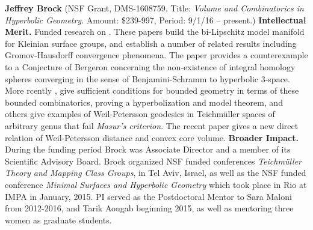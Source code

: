 \textbf{Jeffrey Brock} (NSF Grant, DMS-1608759. Title: {\em Volume and Combinatorics in Hyperbolic Geometry}. Amount: \$239-997, Period: 9/1/16 --
present.)  \textbf{Intellectual Merit.} 
Funded research on 
\cite{Brock:Canary:Minsky:elc,BBCM:pullout,
BBCL:dlt,Brock:Dunfield:inj,Brock:ams}.
 These papers build the bi-Lipschitz model manifold for Kleinian surface groups, and establish a number of related results including Gromov-Hausdorff convergence phenomena.
The paper \cite{Brock:Dunfield:inj} provides a counterexample to a Conjecture of Bergeron concerning the non-existence of integral homology spheres converging in the sense of
Benjamini-Schramm to hyperbolic 3-space.  
More rcently \cite{BMNS:bounded:models,Brock:Modami:nue,Brock:Bromberg:vol,Brock:Bromberg:cone:inflex}, give sufficient conditions for bounded geometry in terms of these bounded combinatorics, proving a hyperbolization and model theorem, and others give examples of Weil-Petersson geodesics in Teichm\"uller spaces of arbitrary genus that fail {\em Masur's criterion}. The recent paper
  \cite{Brock:Bromberg:vol} gives a new direct relation of Weil-Petersson distance and convex core volume.
\textbf{Broader Impact.} During the funding period Brock was Associate Director and a member of its Scientific Advisory Board. Brock organized NSF funded conferences \textit{ Teichm\"uller Theory and Mapping Class Groups}, in Tel Aviv, Israel, as well as the NSF funded conference \textit{ Minimal Surfaces and Hyperbolic Geometry} which took place in Rio at IMPA in January, 2015.
PI served as the Postdoctoral Mentor to Sara Maloni from 2012-2016, and Tarik Aougab beginning 2015, as well as mentoring three women as graduate students. 